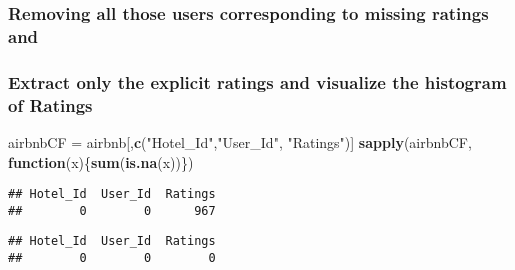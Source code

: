 \documentclass[]{article}
\newenvironment{Shaded}{\begin{snugshade}}{\end{snugshade}}
\newcommand{\ControlFlowTok}[1]{\textcolor[rgb]{0.13,0.29,0.53}{\textbf{#1}}}
\newcommand{\DecValTok}[1]{\textcolor[rgb]{0.00,0.00,0.81}{#1}}
\newcommand{\KeywordTok}[1]{\textcolor[rgb]{0.13,0.29,0.53}{\textbf{#1}}}
\newcommand{\NormalTok}[1]{#1}
\newcommand{\OperatorTok}[1]{\textcolor[rgb]{0.81,0.36,0.00}{\textbf{#1}}}
\newcommand{\StringTok}[1]{\textcolor[rgb]{0.31,0.60,0.02}{#1}}
\begin{document}
\hypertarget{removing-all-those-users-corresponding-to-missing-ratings-and}{%
\subsubsection{Removing all those users corresponding to missing ratings
and}\label{removing-all-those-users-corresponding-to-missing-ratings-and}}

\hypertarget{extract-only-the-explicit-ratings-and-visualize-the-histogram-of-ratings}{%
\subsubsection{Extract only the explicit ratings and visualize the
histogram of
Ratings}\label{extract-only-the-explicit-ratings-and-visualize-the-histogram-of-ratings}}

\begin{Shaded}
\begin{Highlighting}[]
\NormalTok{airbnbCF =}\StringTok{ }\NormalTok{airbnb[,}\KeywordTok{c}\NormalTok{(}\StringTok{"Hotel_Id"}\NormalTok{,}\StringTok{"User_Id"}\NormalTok{, }\StringTok{"Ratings"}\NormalTok{)]}
\KeywordTok{sapply}\NormalTok{(airbnbCF, }\ControlFlowTok{function}\NormalTok{(x)\{}\KeywordTok{sum}\NormalTok{(}\KeywordTok{is.na}\NormalTok{(x))\})}
\end{Highlighting}
\end{Shaded}

\begin{verbatim}
## Hotel_Id  User_Id  Ratings 
##        0        0      967
\end{verbatim}

\begin{Shaded}
\end{Shaded}

\begin{verbatim}
## Hotel_Id  User_Id  Ratings 
##        0        0        0
\end{verbatim}
\end{document}
